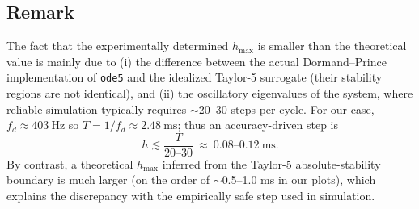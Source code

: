 \subsection*{Remark} 
The fact that the experimentally determined $h_{\max}$ is smaller than the theoretical value is mainly due to (i) the difference between the actual Dormand–Prince implementation of \texttt{ode5} and the idealized Taylor-5 surrogate (their stability regions are not identical), and (ii) the oscillatory eigenvalues of the system, where reliable simulation typically requires $\sim$20–30 steps per cycle. For our case, $f_d\!\approx\!403~\text{Hz}$ so $T\!=\!1/f_d\!\approx\!2.48~\text{ms}$; thus an accuracy-driven step is
\[
h \lesssim \frac{T}{20\text{–}30}\ \approx\ 0.08\text{–}0.12~\text{ms}.
\]
By contrast, a theoretical $h_{\max}$ inferred from the Taylor-5 absolute-stability boundary is much larger (on the order of $\sim$0.5–1.0 ms in our plots), which explains the discrepancy with the empirically safe step used in simulation.







